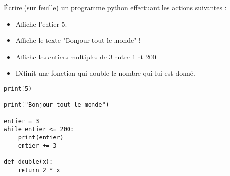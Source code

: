 \documentclass{beamer}
\begin{document}

\begin{frame}
	Écrire (sur feuille) un programme python effectuant les actions suivantes :
	\begin{itemize}
		\item Affiche l'entier 5.
		\item Affiche le texte "Bonjour tout le monde" !
		\item Affiche les entiers multiples de 3 entre 1 et 200.
		\item Définit une fonction qui double le nombre qui lui est donné.
	\end{itemize}
\end{frame}

\begin{frame}[containsverbatim]
	\begin{lstlisting}
print(5)

print("Bonjour tout le monde")

entier = 3
while entier <= 200:
    print(entier)
    entier += 3

def double(x):
    return 2 * x
	\end{lstlisting}
\end{frame}
\end{document}
